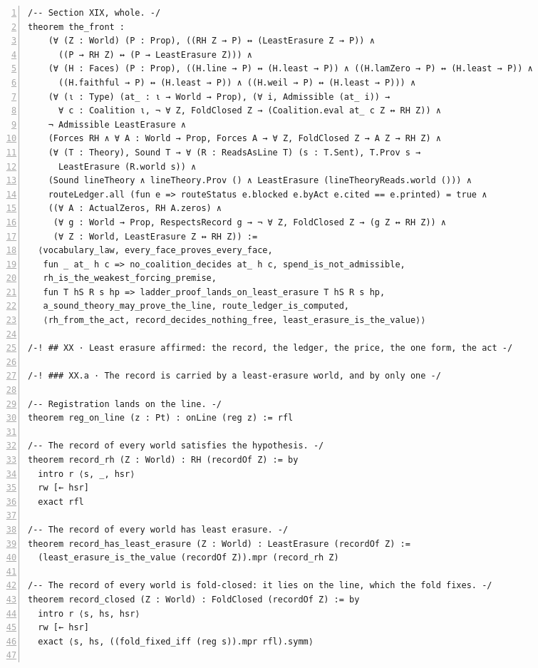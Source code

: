 \documentclass[10pt]{article}
\newcommand{\leansize}{\fontsize{5.5pt}{6.75pt}\selectfont}
\begin{document}
\begin{multicols}{2}
\begin{Verbatim}[numbers=left,firstnumber=1,numbersep=3pt,xleftmargin=2.6em,breaklines=true,breakanywhere=true,breakautoindent=false,breakindent=1.4em,breaksymbolleft={},breakanywheresymbolpre={},fontsize=\leansize]
/-- Section XIX, whole. -/
theorem the_front :
    (∀ (Z : World) (P : Prop), ((RH Z → P) ↔ (LeastErasure Z → P)) ∧
      ((P → RH Z) ↔ (P → LeastErasure Z))) ∧
    (∀ (H : Faces) (P : Prop), ((H.line → P) ↔ (H.least → P)) ∧ ((H.lamZero → P) ↔ (H.least → P)) ∧
      ((H.faithful → P) ↔ (H.least → P)) ∧ ((H.weil → P) ↔ (H.least → P))) ∧
    (∀ (ι : Type) (at_ : ι → World → Prop), (∀ i, Admissible (at_ i)) →
      ∀ c : Coalition ι, ¬ ∀ Z, FoldClosed Z → (Coalition.eval at_ c Z ↔ RH Z)) ∧
    ¬ Admissible LeastErasure ∧
    (Forces RH ∧ ∀ A : World → Prop, Forces A → ∀ Z, FoldClosed Z → A Z → RH Z) ∧
    (∀ (T : Theory), Sound T → ∀ (R : ReadsAsLine T) (s : T.Sent), T.Prov s →
      LeastErasure (R.world s)) ∧
    (Sound lineTheory ∧ lineTheory.Prov () ∧ LeastErasure (lineTheoryReads.world ())) ∧
    routeLedger.all (fun e => routeStatus e.blocked e.byAct e.cited == e.printed) = true ∧
    ((∀ A : ActualZeros, RH A.zeros) ∧
     (∀ g : World → Prop, RespectsRecord g → ¬ ∀ Z, FoldClosed Z → (g Z ↔ RH Z)) ∧
     (∀ Z : World, LeastErasure Z ↔ RH Z)) :=
  ⟨vocabulary_law, every_face_proves_every_face,
   fun _ at_ h c => no_coalition_decides at_ h c, spend_is_not_admissible,
   rh_is_the_weakest_forcing_premise,
   fun T hS R s hp => ladder_proof_lands_on_least_erasure T hS R s hp,
   a_sound_theory_may_prove_the_line, route_ledger_is_computed,
   ⟨rh_from_the_act, record_decides_nothing_free, least_erasure_is_the_value⟩⟩

/-! ## XX · Least erasure affirmed: the record, the ledger, the price, the one form, the act -/

/-! ### XX.a · The record is carried by a least-erasure world, and by only one -/

/-- Registration lands on the line. -/
theorem reg_on_line (z : Pt) : onLine (reg z) := rfl

/-- The record of every world satisfies the hypothesis. -/
theorem record_rh (Z : World) : RH (recordOf Z) := by
  intro r ⟨s, _, hsr⟩
  rw [← hsr]
  exact rfl

/-- The record of every world has least erasure. -/
theorem record_has_least_erasure (Z : World) : LeastErasure (recordOf Z) :=
  (least_erasure_is_the_value (recordOf Z)).mpr (record_rh Z)

/-- The record of every world is fold-closed: it lies on the line, which the fold fixes. -/
theorem record_closed (Z : World) : FoldClosed (recordOf Z) := by
  intro r ⟨s, hs, hsr⟩
  rw [← hsr]
  exact ⟨s, hs, ((fold_fixed_iff (reg s)).mpr rfl).symm⟩


\end{Verbatim}
\end{multicols}
\end{document}
